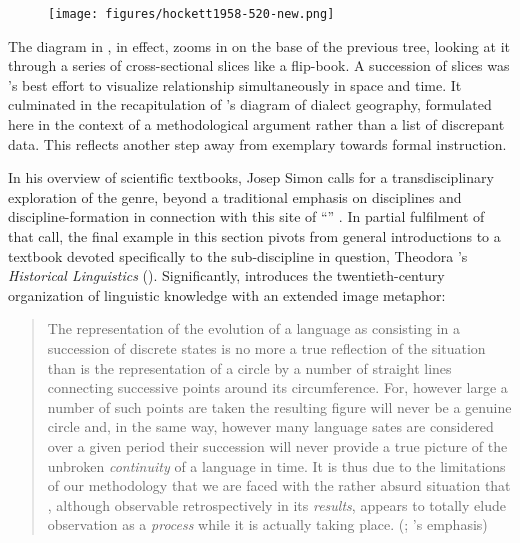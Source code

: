\documentclass[output=paper]{langscibook}
\begin{document}
\begin{figure}
    \centering
    \texttt{[image: figures/hockett1958-520-new.png]}
    \caption{\citet[520]{Hockett19591958}}
    \label{fig:kaplan:hockett1959520}
\end{figure}

\largerpage[1]The diagram in , in effect, zooms in on the base of the previous tree, looking at it through a series of cross-sectional slices like a flip-book. A succession of slices was {\Hockett}'s best effort to visualize relationship simultaneously in space and time. It culminated in the recapitulation of {\Bloomfield}'s diagram of dialect geography, formulated here in the context of a methodological argument rather than a list of discrepant data. This reflects another step away from exemplary towards formal instruction.

In his overview of scientific textbooks, Josep Simon calls for a transdisciplinary exploration of the genre, beyond a traditional emphasis on disciplines and dis\-ci\-pline-formation in connection with this site of ``'' \citep[475]{Simon2016}. In partial fulfilment of that call, the final example in this section pivots from general introductions to a textbook devoted specifically to the sub-discipline in question, Theodora {\Bynon}'s \emph{Historical Linguistics} (\citeyear{Bynon1977}). Significantly, {\Bynon} introduces the twentieth-century organization of linguistic knowledge with an extended image metaphor:

\begin{quotation}
The representation of the evolution of a language as consisting in a succession of discrete states is no more a true reflection of the situation than is the representation of a circle by a number of straight lines connecting successive points around its circumference. For, however large a number of such points are taken the resulting figure will never be a genuine circle and, in the same way, however many language sates are considered over a given period their succession will never provide a true picture of the unbroken \emph{continuity} of a language in time. It is thus due to the limitations of our methodology that we are faced with the rather absurd situation that , although observable retrospectively in its \emph{results}, appears to totally elude observation as a \emph{process} while it is actually taking place. (\citealt[2]{Bynon1977}; {\Bynon}'s emphasis)
\end{quotation}
\end{document}

